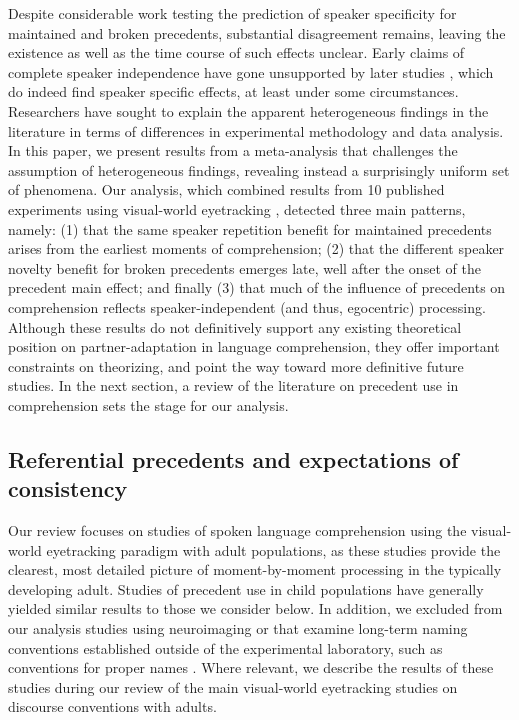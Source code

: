 \documentclass[doc,fignum,apacite,floatsintext]{apa6}
\begin{document}
Despite considerable work testing the prediction of speaker specificity for maintained and broken precedents, substantial disagreement remains, leaving the existence as well as the time course of such effects unclear.  Early claims of complete speaker independence \cite{barrkeysar02} have gone unsupported by later studies \cite{metzingbrennan03,brownschmidt09}, which do indeed find speaker specific effects, at least under some circumstances.  Researchers have sought to explain the apparent heterogeneous findings in the literature in terms of differences in experimental methodology and data analysis.  In this paper, we present results from a meta-analysis that challenges the assumption of heterogeneous findings, revealing instead a surprisingly uniform set of phenomena.  Our analysis, which combined results from 10 published experiments using visual-world eyetracking \cite{cooper74,tanenhausetal95}, detected three main patterns, namely: (1) that the same speaker repetition benefit for maintained precedents arises from the earliest moments of comprehension; (2) that the different speaker novelty benefit for broken precedents emerges late, well after the onset of the precedent main effect; and finally (3) that much of the influence of precedents on comprehension reflects speaker-independent (and thus, egocentric) processing.  Although these results do not definitively support any existing theoretical position on partner-adaptation in language comprehension, they offer important constraints on theorizing, and point the way toward more definitive future studies.  In the next section, a review of the literature on precedent use in comprehension sets the stage for our analysis.

\subsection{Referential precedents and expectations of consistency}

Our review focuses on studies of spoken language comprehension using the visual-world eyetracking paradigm with adult populations, as these studies provide the clearest, most detailed picture of moment-by-moment processing in the typically developing adult.  Studies of precedent use in child populations \cite{GrahamSedivyKhu2014,MatthewsLievenTomasello2012} have generally yielded similar results to those we consider below.  In addition, we excluded from our analysis studies using neuroimaging \cite{BogelsEtAl2014} or that examine long-term naming conventions established outside of the experimental laboratory, such as conventions for proper names \cite{BarrJacksonPhillips2014}.  Where relevant, we describe the results of these studies during our review of the main visual-world eyetracking studies on discourse conventions with adults.
\end{document}
